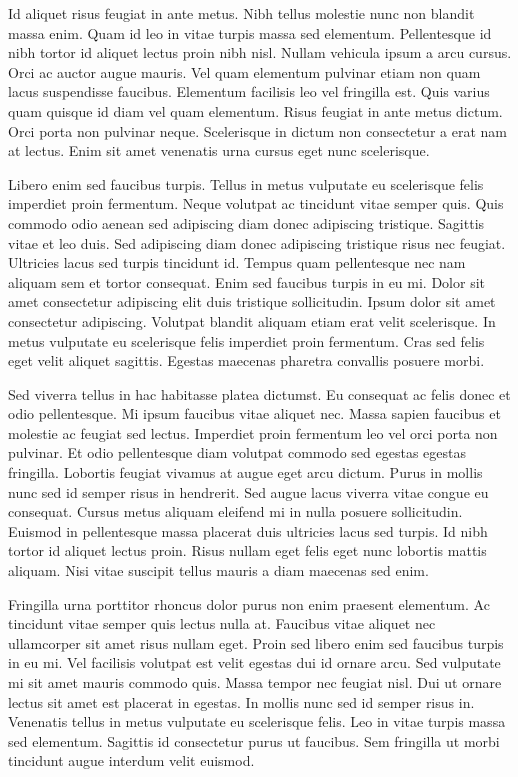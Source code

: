 \documentclass[11pt,]{article}
\begin{document}
Id aliquet risus feugiat in ante metus. Nibh tellus molestie nunc non
blandit massa enim. Quam id leo in vitae turpis massa sed elementum.
Pellentesque id nibh tortor id aliquet lectus proin nibh nisl. Nullam
vehicula ipsum a arcu cursus. Orci ac auctor augue mauris. Vel quam
elementum pulvinar etiam non quam lacus suspendisse faucibus. Elementum
facilisis leo vel fringilla est. Quis varius quam quisque id diam vel
quam elementum. Risus feugiat in ante metus dictum. Orci porta non
pulvinar neque. Scelerisque in dictum non consectetur a erat nam at
lectus. Enim sit amet venenatis urna cursus eget nunc scelerisque.

Libero enim sed faucibus turpis. Tellus in metus vulputate eu
scelerisque felis imperdiet proin fermentum. Neque volutpat ac tincidunt
vitae semper quis. Quis commodo odio aenean sed adipiscing diam donec
adipiscing tristique. Sagittis vitae et leo duis. Sed adipiscing diam
donec adipiscing tristique risus nec feugiat. Ultricies lacus sed turpis
tincidunt id. Tempus quam pellentesque nec nam aliquam sem et tortor
consequat. Enim sed faucibus turpis in eu mi. Dolor sit amet consectetur
adipiscing elit duis tristique sollicitudin. Ipsum dolor sit amet
consectetur adipiscing. Volutpat blandit aliquam etiam erat velit
scelerisque. In metus vulputate eu scelerisque felis imperdiet proin
fermentum. Cras sed felis eget velit aliquet sagittis. Egestas maecenas
pharetra convallis posuere morbi.

Sed viverra tellus in hac habitasse platea dictumst. Eu consequat ac
felis donec et odio pellentesque. Mi ipsum faucibus vitae aliquet nec.
Massa sapien faucibus et molestie ac feugiat sed lectus. Imperdiet proin
fermentum leo vel orci porta non pulvinar. Et odio pellentesque diam
volutpat commodo sed egestas egestas fringilla. Lobortis feugiat vivamus
at augue eget arcu dictum. Purus in mollis nunc sed id semper risus in
hendrerit. Sed augue lacus viverra vitae congue eu consequat. Cursus
metus aliquam eleifend mi in nulla posuere sollicitudin. Euismod in
pellentesque massa placerat duis ultricies lacus sed turpis. Id nibh
tortor id aliquet lectus proin. Risus nullam eget felis eget nunc
lobortis mattis aliquam. Nisi vitae suscipit tellus mauris a diam
maecenas sed enim.

Fringilla urna porttitor rhoncus dolor purus non enim praesent
elementum. Ac tincidunt vitae semper quis lectus nulla at. Faucibus
vitae aliquet nec ullamcorper sit amet risus nullam eget. Proin sed
libero enim sed faucibus turpis in eu mi. Vel facilisis volutpat est
velit egestas dui id ornare arcu. Sed vulputate mi sit amet mauris
commodo quis. Massa tempor nec feugiat nisl. Dui ut ornare lectus sit
amet est placerat in egestas. In mollis nunc sed id semper risus in.
Venenatis tellus in metus vulputate eu scelerisque felis. Leo in vitae
turpis massa sed elementum. Sagittis id consectetur purus ut faucibus.
Sem fringilla ut morbi tincidunt augue interdum velit euismod.





\newpage
\singlespacing 

\end{document}
